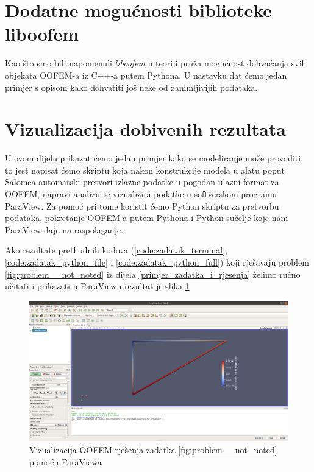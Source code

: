 \documentclass[a4paper,twoside,12pt]{memoir} %
\begin{document}
\section{Dodatne mogućnosti biblioteke liboofem}
Kao što smo bili napomenuli \textit{liboofem} u teoriji pruža mogućnost dohvaćanja svih objekata OOFEM-a iz C++-a putem Pythona. U nastavku dat ćemo jedan primjer s opisom kako dohvatiti još neke od zanimljivijih podataka.




\section{Vizualizacija dobivenih rezultata}
U ovom dijelu prikazat ćemo jedan primjer kako se modeliranje može provoditi, to jest napisat ćemo skriptu koja nakon konstrukcije modela u alatu poput Salomea automatski pretvori izlazne podatke u pogodan ulazni format za OOFEM, napravi analizu te vizualizira podatke u softverskom programu ParaView. Za pomoć pri tome koristit ćemo Python skriptu za pretvorbu podataka, pokretanje OOFEM-a putem Pythona i Python sučelje koje nam ParaView daje na raspolaganje.



Ako rezultate prethodnih kodova (\ref{code:zadatak_terminal}, \ref{code:zadatak_python_file} i \ref{code:zadatak_python_full}) koji rješavaju problem \ref{fig:problem__not_noted} iz dijela \ref{primjer_zadatka_i_rjesenja} želimo ručno učitati i prikazati u ParaViewu rezultat je slika \ref{fig:visualization_of_zadatak_paraview}

\begin{figure}[h!t]
\begin{center}
\includegraphics[scale=0.21]{pictures/chapter_zadatak/paraview_zadatak.png}
\caption{Vizualizacija OOFEM rješenja zadatka \ref{fig:problem__not_noted} pomoću ParaViewa}
\label{fig:visualization_of_zadatak_paraview}
\end{center}
\end{figure}
\end{document}
